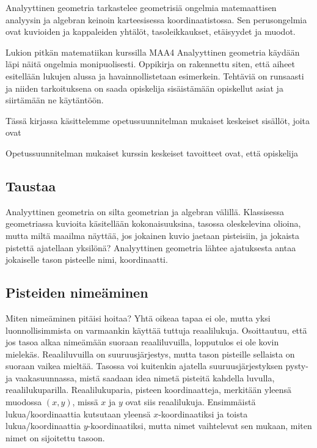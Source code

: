 Analyyttinen geometria tarkastelee geometrisiä ongelmia matemaattisen analyysin ja algebran keinoin karteesisessa koordinaatistossa. Sen perusongelmia ovat kuvioiden ja kappaleiden yhtälöt, tasoleikkaukset, etäisyydet ja muodot.

Lukion pitkän matematiikan kurssilla MAA4 Analyyttinen geometria käydään läpi näitä ongelmia monipuolisesti. Oppikirja on rakennettu siten, että aiheet esitellään lukujen alussa ja havainnollistetaan esimerkein. Tehtäviä on runsaasti ja niiden tarkoituksena on saada opiskelija sisäistämään opiskellut asiat ja siirtämään ne käytäntöön.

Tässä kirjassa käsittelemme opetussuunnitelman mukaiset keskeiset sisällöt, joita ovat

Opetussuunnitelman mukaiset kurssin keskeiset tavoitteet ovat, että opiskelija

\subsection*{Taustaa}


Analyyttinen geometria on silta geometrian ja algebran välillä. Klassisessa geometriassa kuvioita käsitellään kokonaisuuksina, tasossa oleskelevina olioina, mutta miltä maailma näyttää, jos jokainen kuvio jaetaan pisteisiin, ja jokaista pistettä ajatellaan yksilönä? Analyyttinen geometria lähtee ajatuksesta antaa jokaiselle tason pisteelle nimi, koordinaatti.

\subsection*{Pisteiden nimeäminen}

Miten nimeäminen pitäisi hoitaa? Yhtä oikeaa tapaa ei ole, mutta yksi luonnollisimmista on varmaankin käyttää tuttuja reaalilukuja. Osoittautuu, että jos tasoa alkaa nimeämään suoraan reaaliluvuilla, lopputulos ei ole kovin mielekäs. Reaaliluvuilla on suuruusjärjestys, mutta tason pisteille sellaista on suoraan vaikea mieltää. Tasossa voi kuitenkin ajatella suuruusjärjestyksen pysty- ja vaakasuunnassa, mistä saadaan idea nimetä pisteitä kahdella luvulla, reaalilukuparilla. Reaalilukuparia, pisteen koordinaatteja, merkitään yleensä muodossa $(x,y)$, missä $x$ ja $y$ ovat siis reaalilukuja. Ensimmäistä lukua/koordinaattia kutsutaan yleensä $x$-koordinaatiksi ja toista lukua/koordinaattia $y$-koordinaatiksi, mutta nimet vaihtelevat sen mukaan, miten nimet on sijoitettu tasoon.

